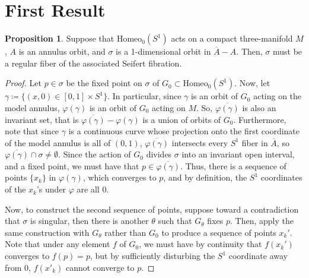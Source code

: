 \documentclass[10pt, oneside]{article}
\newcommand{\homeoS}{\text{Homeo}_0(S^1)}
\newcommand{\cl}[1]{\overline{#1}}
\theoremstyle{definition}
\newtheorem{prop}{Proposition}
\theoremstyle{definition}
\begin{document}
\section {First Result}
\begin{prop}
    Suppose that $\homeoS$ acts on a compact three-manifold $M$, $A$ is an annulus orbit, and $\sigma$ is a 1-dimensional orbit in $\cl{A} - A$. Then, $\sigma$ must be a regular fiber of the associated Seifert fibration.
\end{prop}
\begin{proof}
    Let $p\in\sigma$ be the fixed point on $\sigma$ of $G_0\subset \homeoS$. Now, let $\gamma \coloneqq \{(x, 0)\in[0,1]\times S^1\}$. In particular, since $\gamma$ is an orbit of $G_0$ acting on the model annulus, $\varphi(\gamma)$ is an orbit of $G_0$ acting on $M$. So, $\cl{\varphi(\gamma)}$ is also an invariant set, that is $\cl{\varphi(\gamma)} - \varphi(\gamma)$ is a union of orbits of $G_0$. Furthermore, note that since $\gamma$ is a continuous curve whose projection onto the first coordinate of the model annulus is all of $(0, 1)$, $\cl{\varphi(\gamma)}$ intersects every $S^1$ fiber in $\cl{A}$, so $\cl{\varphi(\gamma)}\cap \sigma \neq \emptyset$. Since the action of $G_0$ divides $\sigma$ into an invariant open interval, and a fixed point, we must have that $p\in \cl{\varphi(\gamma)}$. Thus, there is a sequence of points $\{x_k\}$ in $\varphi(\gamma)$, which converges to $p$, and by definition, the $S^1$ coordinates of the $x_k$'s under $\varphi$ are all 0. 

    Now, to construct the second sequence of points, suppose toward a contradiction that $\sigma$ is singular, then there is another $\theta$ such that $G_\theta$ fixes $p$. Then, apply the same construction with $G_\theta$ rather than $G_0$ to produce a sequence of points $x_k'$. Note that under any element $f$ of $G_0$, we must have by continuity that $f(x_k')$ converges to $f(p)=p$, but by sufficiently disturbing the $S^1$ coordinate away from $0$, $f(x'_k)$ cannot converge to $p$.
\end{proof}
\end{document}
